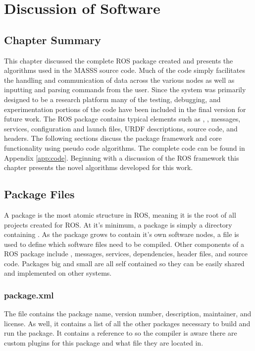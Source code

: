 \chapter{Discussion of Software}
\label{chap:code}
\section{Chapter Summary}
This chapter discussed the complete ROS package created and presents the algorithms used in the MASSS source code. Much of the code simply facilitates the handling and communication of data across the various nodes as well as inputting and parsing commands from the user. Since the system was primarily designed to be a research platform many of the testing, debugging, and experimentation portions of the code have been included in the final version for future work. The ROS package contains typical elements such as , , messages, services, configuration and launch files, URDF descriptions, source code, and headers. The following sections discuss the package framework and core functionality using pseudo code algorithms. The complete code can be found in Appendix \ref{app:code}. Beginning with a discussion of the ROS framework this chapter presents the novel algorithms developed for this work.\\
\section{Package Files}

A package is the most atomic structure in ROS, meaning it is the root of all projects created for ROS. At it's minimum, a package is simply a directory containing . As the package grows to contain it's own software nodes, a  file is used to define which software files need to be compiled. Other components of a ROS package include , messages, services, dependencies, header files, and source code. Packages big and small are all self contained so they can be easily shared and implemented on other systems.\\

\subsection{package.xml}
The file  contains the package name, version number, description, maintainer, and license. As well, it contains a list of all the other packages necessary to build and run the package. It contains a reference to  so the compiler is aware there are custom plugins for this package and what file they are located in.\\

